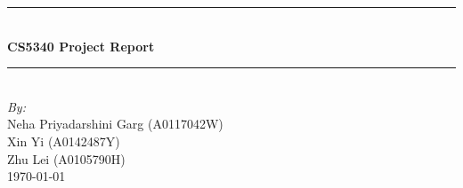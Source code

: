 \documentclass{article}
\begin{document}
\begin{titlepage}

\newcommand{\HRule}{\rule{\linewidth}{0.5mm}} %

\center %
 



\HRule \\[0.4cm]
{ \huge \bfseries CS5340 Project Report}\\[0.4cm] %
\HRule \\[1.5cm]




\Large \emph{By:}\\
Neha Priyadarshini Garg (A0117042W)\\ %
Xin Yi (A0142487Y)\\
Zhu Lei (A0105790H)\\[3cm]


{\large \today}\\[2cm] %

\vfill %

\end{titlepage}
\end{document}

